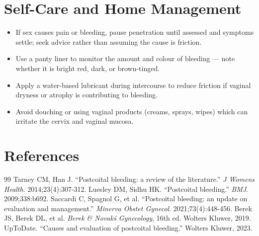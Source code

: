 \section*{Self-Care and Home Management}
\begin{itemize}
 \item If sex causes pain or bleeding, pause penetration until assessed and symptoms settle; seek advice rather than assuming the cause is friction.
 \item Use a panty liner to monitor the amount and colour of bleeding — note whether it is bright red, dark, or brown-tinged.
 \item Apply a water-based lubricant during intercourse to reduce friction if vaginal dryness or atrophy is contributing to bleeding.
 \item Avoid douching or using vaginal products (creams, sprays, wipes) which can irritate the cervix and vaginal mucosa.
\end{itemize}

\section*{References}
\begin{thebibliography}{99}
 Tarney CM, Han J. ``Postcoital bleeding: a review of the literature.'' \textit{J Womens Health}. 2014;23(4):307-312.
 Luesley DM, Sidhu HK. ``Postcoital bleeding.'' \textit{BMJ}. 2009;338:b692.
 Saccardi C, Spagnol G, et al. ``Postcoital bleeding: an update on evaluation and management.'' \textit{Minerva Obstet Gynecol}. 2021;73(4):448-456.
 Berek JS, Berek DL, et al. \textit{Berek \& Novak\'s Gynecology}, 16th ed. Wolters Kluwer, 2019.
 UpToDate. ``Causes and evaluation of postcoital bleeding.'' Wolters Kluwer, 2023.
\end{thebibliography}
